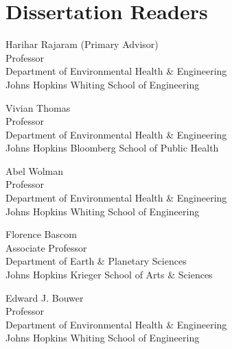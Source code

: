 \chapter*{Dissertation Readers}

\begin{singlespace}

\noindent Harihar Rajaram (Primary Advisor)\\
\indent Professor\\
\indent Department of Environmental Health & Engineering\\
\indent Johns Hopkins Whiting School of Engineering\\
\medskip

\noindent Vivian Thomas\\
\indent Professor\\
\indent Department of Environmental Health \& Engineering\\
\indent Johns Hopkins Bloomberg School of Public Health\\
\medskip

\noindent Abel Wolman\\
\indent Professor \\
\indent Department of Environmental Health \& Engineering\\
\indent Johns Hopkins Whiting School of Engineering\\
\medskip

\noindent Florence Bascom\\
\indent Associate Professor\\
\indent Department of Earth & Planetary Sciences\\
\indent Johns Hopkins Krieger School of Arts \& Sciences\\
\medskip

\noindent Edward J. Bouwer\\
\indent Professor\\
\indent Department of Environmental Health \& Engineering\\
\indent Johns Hopkins Whiting School of Engineering\\
\medskip 

\end{singlespace}

\newpage 